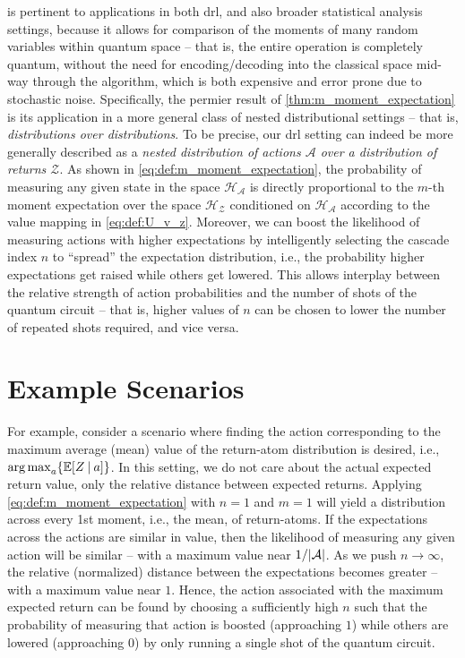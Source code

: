 \documentclass{article}
\DeclarePairedDelimiter{\abs}{\lvert}{\rvert} %
\DeclarePairedDelimiter{\bparen}{[}{]} %
\DeclarePairedDelimiter{\set}{\{}{\}} %
\newcommand{\E}{\mathbb{E}} %
\newcommand{\hilbert}{\mathcal{H}} %
\newcommand{\bfunc}[2]{#1\bparen*{#2}} %
\newcommand{\given}[1][]{\:#1\vert\:}
\begin{document}
 is pertinent to applications in both \ac{drl}, and also broader statistical analysis settings, because it allows for comparison of the moments of many random variables within quantum space -- that is, the entire operation is completely quantum, without the need for encoding/decoding into the classical space mid-way through the algorithm, which is both expensive and error prone due to stochastic noise. Specifically, the permier result of \cref{thm:m_moment_expectation} is its application in a more general class of nested distributional settings -- that is, \emph{distributions over distributions}. To be precise, our \ac{drl} setting can indeed be more generally described as a \emph{nested distribution of actions $\mathcal{A}$ over a distribution of returns $\mathcal{Z}$}.
% 
As shown in \cref{eq:def:m_moment_expectation}, the probability of measuring any given state in the space $\hilbert_{\mathcal{A}}$ is directly proportional to the $m$-th moment expectation over the space $\hilbert_{\mathcal{Z}}$ conditioned on $\hilbert_{\mathcal{A}}$ according to the value mapping in \cref{eq:def:U_v_z}.
% 
Moreover, we can boost the likelihood of measuring actions with higher expectations by intelligently selecting the cascade index $n$ to ``spread'' the expectation distribution, i.e., the probability higher expectations get raised while others get lowered. This allows interplay between the relative strength of action probabilities and the number of shots of the quantum circuit -- that is, higher values of $n$ can be chosen to lower the number of repeated shots required, and vice versa.

\section{Example Scenarios}

For example, consider a scenario where finding the action corresponding to the maximum average (mean) value of the return-atom distribution is desired, i.e., ${\arg\max}_{a}{\set*{\bfunc{\mathbb{E}}{Z \given a}}}$. In this setting, we do not care about the actual expected return value, only the relative distance between expected returns. Applying \cref{eq:def:m_moment_expectation} with $n=1$ and $m=1$ will yield a distribution across every 1st moment, i.e., the mean, of return-atoms. If the expectations across the actions are similar in value, then the likelihood of measuring any given action will be similar -- with a maximum value near $1/\abs{\mathcal{A}}$. As we push $n \to \infty$, the relative (normalized) distance between the expectations becomes greater -- with a maximum value near $1$. Hence, the action associated with the maximum expected return can be found by choosing a sufficiently high $n$ such that the probability of measuring that action is boosted (approaching $1$) while others are lowered (approaching $0$) by only running a single shot of the quantum circuit.
\end{document}
